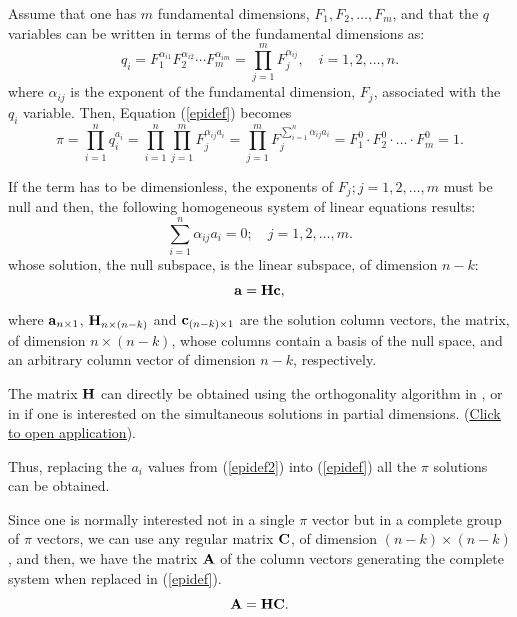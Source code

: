 Assume that one has $m$ fundamental dimensions, $F_1, F_2,\dots,F_m$, and that the $q$ variables can be written in terms of the fundamental dimensions as:
\begin{equation}
q_i = F_1^{\alpha_{i1}} F_2^{\alpha_{i2}} \cdots F_m^{\alpha_{im}} = \prod\limits_{j=1}^{m} F_j^{\alpha_{ij}},\quad i=1,2,\dots,n.
\end{equation}
where $\alpha_{ij}$ is the exponent of the fundamental dimension, $F_j$, associated with the $q_i$ variable.
Then, Equation (\ref{epidef}) becomes
\begin{equation}
\pi = \prod\limits_{i=1}^{n} q_i^{a_i }= \prod\limits_{i=1}^{n} \prod\limits_{j=1}^{m} F_j^{\alpha_{ij}a_{i}} = \prod\limits_{j=1}^{m}F_j^{\sum\limits_{i=1}^{n}\alpha_{ij}a_{i}}=F_1^0 \cdot F_2^0 \cdot \dots \cdot F_m^0 =1.
\end{equation}

If the term has to be dimensionless, the exponents of $F_j; j=1,2,\dots,m$ must be null and then, the following homogeneous system of linear equations results:
\begin{equation}\label{epidef1}
   \boxed{ \sum\limits_{i=1}^{n}\alpha_{ij}a_{i} = 0;\quad j=1,2,\dots,m.}
\end{equation}
whose solution, the null subspace, is the linear subspace, of dimension $n-k$:
\begin{equation}\label{epidef2}
    {\bf a} = {\bf H} {\bf c},
\end{equation}
where ${\bf a}_{n \times 1}$, ${\bf H}_{n \times (n-k)}$ and ${\bf c}_{(n-k) \times 1}$ are the solution column vectors, the matrix, of dimension $n \times (n-k)$, whose columns contain a basis of the null space, and an arbitrary column vector of dimension $n-k$, respectively.

The matrix ${\bf H}$ can directly be obtained using the orthogonality algorithm in \cite{castilloCJP:01}, \cite{Castillo2001OrthogonallyBased} or in \cite{CASTILLO2002131} if one is interested on the simultaneous solutions in partial dimensions. (\href{https://enriquecastilloron.github.io/mi-libro-interactivo/apps/SolveHomogeneousSystemSteps.html}{\underline{Click to open application}}).

Thus, replacing the $a_i$ values from (\ref{epidef2}) into (\ref{epidef}) all the $\pi$ solutions can be obtained.

Since one is normally interested not in a single $\pi$ vector but in a complete group of $\pi$ vectors, we can use any regular matrix ${\bf C}$, of dimension $(n-k) \times (n-k)$, and then, we have the matrix ${\bf A}$ of the column vectors generating the complete system when replaced in (\ref{epidef}).
\begin{equation}\label{epidef3}
   {\bf A} =  {\bf H} {\bf C}.
\end{equation}

